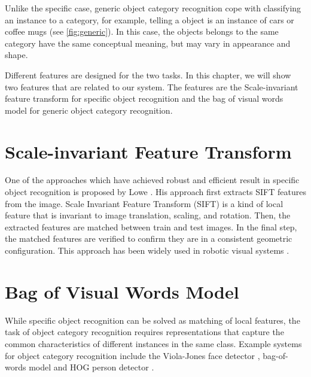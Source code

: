 \documentclass[12pt,final,twoside]{report}
\theoremstyle{plain}
\theoremstyle{definition}
\theoremstyle{remark}
\begin{document}

Unlike the specific case, generic object category recognition cope with classifying an instance to a category, for example, telling a object is an instance of cars or coffee mugs (see \cref{fig:generic}). In this case, the objects belongs to the same category have the same conceptual meaning, but may vary in appearance and shape.

Different features are designed for the two tasks. In this chapter, we will show two features that are related to our system. The features are the Scale-invariant feature transform for specific object recognition and the bag of visual words model for generic object category recognition.



\section{Scale-invariant Feature Transform}
One of the approaches which have achieved robust and efficient result in specific object recognition is proposed by Lowe \cite{lowe_object_1999}. His approach first extracts SIFT features from the image. Scale Invariant Feature Transform (SIFT) is a kind of local feature that is invariant to image translation, scaling, and rotation. Then, the extracted features are matched between train and test images. In the final step, the matched features are verified to confirm they are in a consistent geometric configuration. This approach has been widely used in robotic visual systems \cite{grauman_visual_2011}.

\section{Bag of Visual Words Model}
While specific object recognition can be solved as matching of local features, the task of object category recognition requires representations that capture the common characteristics of different instances in the same class. Example systems for object category recognition include the Viola-Jones face detector \cite{viola_rapid_2001}, bag-of-words model \cite{csurka_visual_2004} and HOG person detector \cite{dalal_histograms_2005}. 
\end{document}
